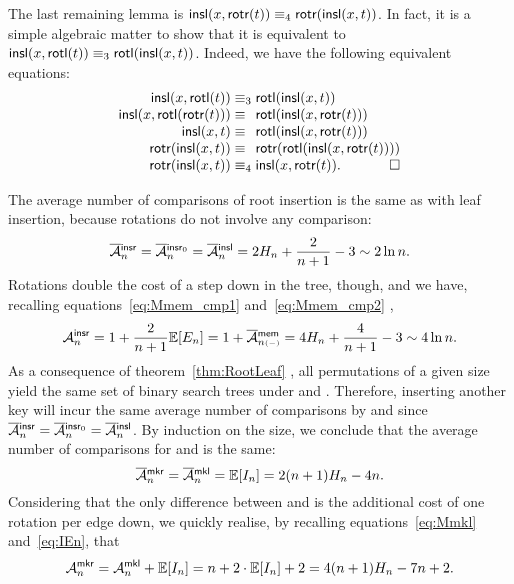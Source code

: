 The last remaining lemma is \(\textsf{insl}(x,\textsf{rotr}(t)) \equiv_4
\textsf{rotr}(\textsf{insl}(x,t))\). In fact, it is a simple algebraic
matter to show that it is equivalent to \(\textsf{insl}(x,\textsf{rotl}(t))
\equiv_3 \textsf{rotl}(\textsf{insl}(x,t))\). Indeed, we have the following
equivalent equations:
\begin{equation*}
\begin{array}{@{}r@{\;}l@{\;}l@{}}
\fun{insl}(x,\fun{rotl}(t)) & \equiv_3 & \fun{rotl}(\fun{insl}(x,t))\\
\fun{insl}(x,\fun{rotl}(\fun{rotr}(t))) & \equiv &
\fun{rotl}(\fun{insl}(x,\fun{rotr}(t)))\\
\fun{insl}(x,t) & \equiv & \fun{rotl}(\fun{insl}(x,\fun{rotr}(t)))\\
\fun{rotr}(\fun{insl}(x,t)) & \equiv &
\fun{rotr}(\fun{rotl}(\fun{insl}(x,\fun{rotr}(t))))\\
\fun{rotr}(\fun{insl}(x,t)) & \equiv_4 &
\fun{insl}(x,\fun{rotr}(t)).\hfill\Box
\end{array}
\end{equation*}



The average number of comparisons of root insertion is the same as
with leaf insertion, because rotations do not involve any comparison:
\begin{equation*}
\OM{\fun{insr}}{n} = \OM{\fun{insr}_0}{n} = \OM{\fun{insl}}{n}
= 2H_n + \frac{2}{n+1} - 3 \sim 2\ln n.
\index{insr@$\OM{\fun{insr}}{n}$}
\index{insr0@$\OM{\fun{insr}_0}{n}$}
\end{equation*}
Rotations double the cost of a step down in the tree, though, and we
have, recalling equations~\eqref{eq:Mmem_cmp1}
and~\eqref{eq:Mmem_cmp2} ,
\begin{equation*}
\M{\fun{insr}}{n} = 1 + \frac{2}{n+1}\Expected{E_n} = 1 +
\OM{\fun{mem}}{n{\scriptscriptstyle(-)}} = 4H_n + \frac{4}{n+1} - 3
\sim 4\ln n.
\index{insr@$\M{\fun{insr}}{n}$}
\end{equation*}
As a consequence of theorem~\eqref{thm:RootLeaf}
, all permutations of a given size yield the
same set of binary search trees under  and
. Therefore, inserting another key will incur the same
average number of comparisons by  and  since
\(\OM{\fun{insr}}{n} = \OM{\fun{insr}_0}{n} = \OM{\fun{insl}}{n}\). By
induction on the size, we conclude that the average number of
comparisons for  and  is the same:
\begin{equation*}
\OM{\fun{mkr}}{n} = \OM{\fun{mkl}}{n} = \Expected{I_n}
= 2(n+1)H_n - 4n.
\index{mkr@$\OM{\fun{mkr}}{n}$}
\end{equation*}
Considering that the only difference between  and
 is the additional cost of one rotation per edge down, we
quickly realise, by recalling equations~\eqref{eq:Mmkl}
and~\eqref{eq:IEn}, that
\begin{equation*}
\M{\fun{mkr}}{n} = \M{\fun{mkl}}{n} + \Expected{I_n}
= n + 2 \cdot \Expected{I_n} + 2 = 4(n+1)H_n - 7n + 2.
\index{mkr@$\M{\fun{mkr}}{n}$}
\end{equation*}

